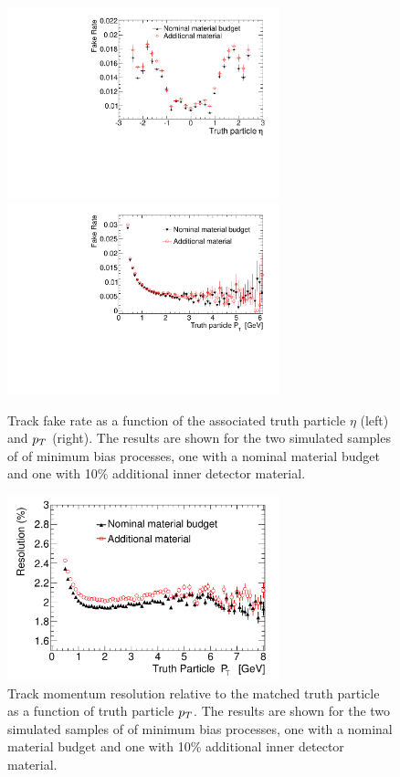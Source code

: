 \begin{figure}[!tp]
\centering
\includegraphics[width=0.7\textwidth]{figure/trackjet/trk_fake_distro_eta2.pdf}
\includegraphics[width=0.7\textwidth]{figure/trackjet/fakerate_pt.pdf}
\caption{Track fake rate as a function of the associated truth particle $\eta$ (left) and $p_{T}$ (right).
	The results are shown for the two simulated samples of of minimum bias processes, one with a nominal material budget
	and one with 10\%  additional inner detector material.}

\label{fig:trk_fakereate}
\end{figure}    

\begin{figure}[!tp]
\centering
\includegraphics[width=0.7\textwidth]{figure/trackjet/resolution2.pdf}
\caption{Track momentum resolution  relative to the matched truth particle as a function of truth particle $p_{T}$.
	The results are shown for the two simulated samples of of minimum bias processes, one with a nominal material budget
	and one with 10\%  additional inner detector material.}


\label{fig:trk_reso}
\end{figure}    

